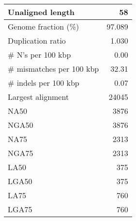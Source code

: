 \documentclass[12pt,a4paper]{article}
\begin{document}
\begin{table}[ht]
\begin{center}
\begin{tabular}{|l*{1}{|r}|}
Unaligned length & 58 \\ \hline
Genome fraction (\%) & 97.089 \\ \hline
Duplication ratio & 1.030 \\ \hline
\# N's per 100 kbp & 0.00 \\ \hline
\# mismatches per 100 kbp & 32.31 \\ \hline
\# indels per 100 kbp & 0.07 \\ \hline
Largest alignment & 24045 \\ \hline
NA50 & 3876 \\ \hline
NGA50 & 3876 \\ \hline
NA75 & 2313 \\ \hline
NGA75 & 2313 \\ \hline
LA50 & 375 \\ \hline
LGA50 & 375 \\ \hline
LA75 & 760 \\ \hline
LGA75 & 760 \\ \hline
\end{tabular}
\end{center}
\end{table}
\end{document}
